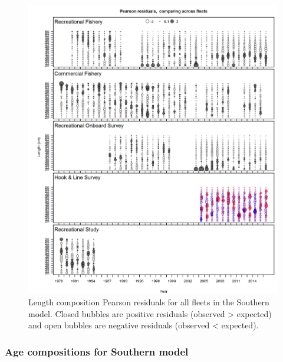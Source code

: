 \documentclass[12pt,]{article}
\begin{document}
\FloatBarrier

\newpage

\begin{figure}[htbp]
\centering
\includegraphics{r4ss/plots_mod2/comp_lenfit__multi-fleet_comparison.png}
\caption{Length composition Pearson residuals for all fleets in the
Southern model. Closed bubbles are positive residuals (observed
\textgreater{} expected) and open bubbles are negative residuals
(observed \textless{} expected). \label{fig:comp_Pearson_length_mod2}}
\end{figure}

\FloatBarrier

\newpage

\subsubsection{Age compositions for Southern
model}\label{age-compositions-for-southern-model}
\end{document}

